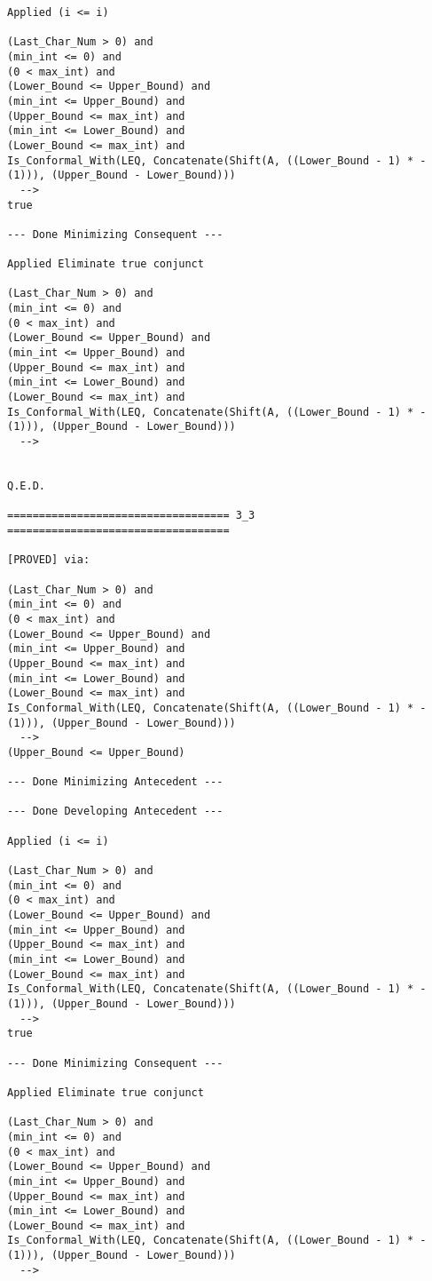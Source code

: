 \begin{lstlisting}[language=resolve]
Applied (i <= i)

(Last_Char_Num > 0) and
(min_int <= 0) and
(0 < max_int) and
(Lower_Bound <= Upper_Bound) and
(min_int <= Upper_Bound) and
(Upper_Bound <= max_int) and
(min_int <= Lower_Bound) and
(Lower_Bound <= max_int) and
Is_Conformal_With(LEQ, Concatenate(Shift(A, ((Lower_Bound - 1) * -(1))), (Upper_Bound - Lower_Bound)))
  -->
true

--- Done Minimizing Consequent ---

Applied Eliminate true conjunct

(Last_Char_Num > 0) and
(min_int <= 0) and
(0 < max_int) and
(Lower_Bound <= Upper_Bound) and
(min_int <= Upper_Bound) and
(Upper_Bound <= max_int) and
(min_int <= Lower_Bound) and
(Lower_Bound <= max_int) and
Is_Conformal_With(LEQ, Concatenate(Shift(A, ((Lower_Bound - 1) * -(1))), (Upper_Bound - Lower_Bound)))
  -->


Q.E.D.

=================================== 3_3 ===================================

[PROVED] via:

(Last_Char_Num > 0) and
(min_int <= 0) and
(0 < max_int) and
(Lower_Bound <= Upper_Bound) and
(min_int <= Upper_Bound) and
(Upper_Bound <= max_int) and
(min_int <= Lower_Bound) and
(Lower_Bound <= max_int) and
Is_Conformal_With(LEQ, Concatenate(Shift(A, ((Lower_Bound - 1) * -(1))), (Upper_Bound - Lower_Bound)))
  -->
(Upper_Bound <= Upper_Bound)

--- Done Minimizing Antecedent ---

--- Done Developing Antecedent ---

Applied (i <= i)

(Last_Char_Num > 0) and
(min_int <= 0) and
(0 < max_int) and
(Lower_Bound <= Upper_Bound) and
(min_int <= Upper_Bound) and
(Upper_Bound <= max_int) and
(min_int <= Lower_Bound) and
(Lower_Bound <= max_int) and
Is_Conformal_With(LEQ, Concatenate(Shift(A, ((Lower_Bound - 1) * -(1))), (Upper_Bound - Lower_Bound)))
  -->
true

--- Done Minimizing Consequent ---

Applied Eliminate true conjunct

(Last_Char_Num > 0) and
(min_int <= 0) and
(0 < max_int) and
(Lower_Bound <= Upper_Bound) and
(min_int <= Upper_Bound) and
(Upper_Bound <= max_int) and
(min_int <= Lower_Bound) and
(Lower_Bound <= max_int) and
Is_Conformal_With(LEQ, Concatenate(Shift(A, ((Lower_Bound - 1) * -(1))), (Upper_Bound - Lower_Bound)))
  -->



\end{lstlisting}
